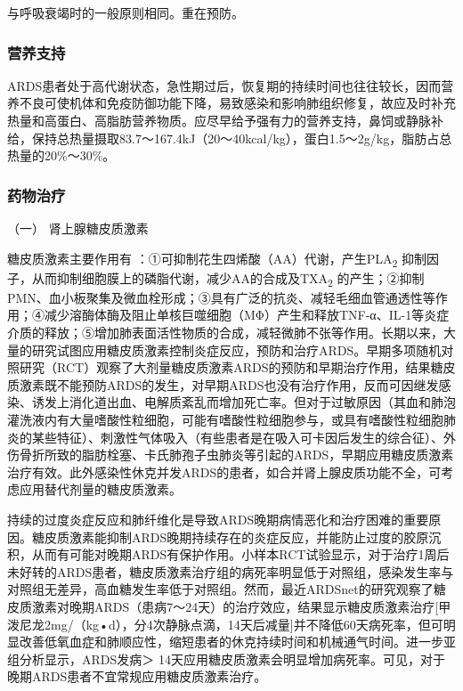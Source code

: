与呼吸衰竭时的一般原则相同。重在预防。

\subsubsection{营养支持}

ARDS患者处于高代谢状态，急性期过后，恢复期的持续时间也往往较长，因而营养不良可使机体和免疫防御功能下降，易致感染和影响肺组织修复，故应及时补充热量和高蛋白、高脂肪营养物质。应尽早给予强有力的营养支持，鼻饲或静脉补给，保持总热量摄取83.7～167.4kJ（20～40kcal/kg），蛋白1.5～2g/kg，脂肪占总热量的20\%～30\%。

\subsubsection{药物治疗}

\hypertarget{text00078.htmlux5cux23CHP3-5-3-6-1}{}
（一） 肾上腺糖皮质激素

糖皮质激素主要作用有
：①可抑制花生四烯酸（AA）代谢，产生PLA\textsubscript{2}
抑制因子，从而抑制细胞膜上的磷脂代谢，减少AA的合成及TXA\textsubscript{2}
的产生；②抑制PMN、血小板聚集及微血栓形成；③具有广泛的抗炎、减轻毛细血管通透性等作用；④减少溶酶体酶及阻止单核巨噬细胞（MΦ）产生和释放TNF-α、IL-1等炎症介质的释放；⑤增加肺表面活性物质的合成，减轻微肺不张等作用。长期以来，大量的研究试图应用糖皮质激素控制炎症反应，预防和治疗ARDS。早期多项随机对照研究（RCT）观察了大剂量糖皮质激素ARDS的预防和早期治疗作用，结果糖皮质激素既不能预防ARDS的发生，对早期ARDS也没有治疗作用，反而可因继发感染、诱发上消化道出血、电解质紊乱而增加死亡率。但对于过敏原因（其血和肺泡灌洗液内有大量嗜酸性粒细胞，可能有嗜酸性粒细胞参与，或具有嗜酸性粒细胞肺炎的某些特征）、刺激性气体吸入（有些患者是在吸入可卡因后发生的综合征）、外伤骨折所致的脂肪栓塞、卡氏肺孢子虫肺炎等引起的ARDS，早期应用糖皮质激素治疗有效。此外感染性休克并发ARDS的患者，如合并肾上腺皮质功能不全，可考虑应用替代剂量的糖皮质激素。

持续的过度炎症反应和肺纤维化是导致ARDS晚期病情恶化和治疗困难的重要原因。糖皮质激素能抑制ARDS晚期持续存在的炎症反应，并能防止过度的胶原沉积，从而有可能对晚期ARDS有保护作用。小样本RCT试验显示，对于治疗1周后未好转的ARDS患者，糖皮质激素治疗组的病死率明显低于对照组，感染发生率与对照组无差异，高血糖发生率低于对照组。然而，最近ARDSnet的研究观察了糖皮质激素对晚期ARDS（患病7～24天）的治疗效应，结果显示糖皮质激素治疗{[}甲泼尼龙2mg/（kg•d），分4次静脉点滴，14天后减量{]}并不降低60天病死率，但可明显改善低氧血症和肺顺应性，缩短患者的休克持续时间和机械通气时间。进一步亚组分析显示，ARDS发病＞
14天应用糖皮质激素会明显增加病死率。可见，对于晚期ARDS患者不宜常规应用糖皮质激素治疗。

